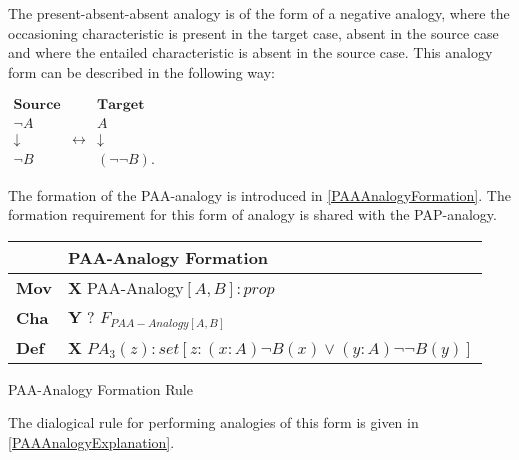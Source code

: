 				The present-absent-absent analogy is of the form of a negative analogy, where the occasioning characteristic is present in  the target case, absent in the source case and where the entailed characteristic is absent in the source case. This analogy form can be described in the following way:
                	\begin{table}[H]
                	\centering	
                	$
                    \begin{array}{ccc}
                    	\textbf{Source} &                 & \textbf{Target} \\
                    	\neg A          &  & A               \\
                    	\downarrow      &  \leftrightarrow & \downarrow      \\
                    	\neg B          &  & (\neg \neg B).
                    \end{array}
               	 	$
               	 	\end{table}
               	 	The formation of the PAA-analogy is introduced in \autoref{PAAAnalogyFormation}. The formation requirement for this form of analogy is shared with the PAP-analogy. 
               	 	
               		\begin{Scheme}[H]\footnotesize
               		\centering
               		\begin{tabular}{l l}
               			                   & \textbf{PAA-Analogy Formation} \\ \toprule
               			\textbf{Mov}      & \textbf{X} PAA-Analogy$[A,B] : prop$ \\ \midrule
               			\textbf{Cha} & \textbf{Y} ? $F_{PAA-Analogy[A,B]}$ \\ \midrule
               			\textbf{Def}   & \textbf{X} $PA_3(z) : set [z : (x : A) \neg B(x) \lor (y : A) \neg \neg B(y)]$ \\ \bottomrule
               		\end{tabular}
               		\caption{PAA-Analogy Formation Rule}
               		\label{PAAAnalogyFormation}
					\end{Scheme}  
               	 	
               	 \noindent The dialogical rule for performing analogies of this form is given in \autoref{PAAAnalogyExplanation}.
					
